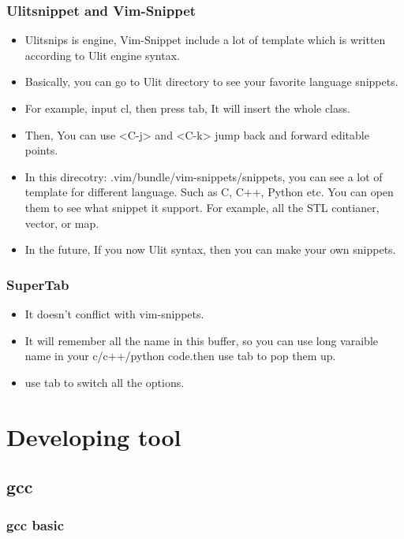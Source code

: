 \documentclass[a4paper,12pt,twoside]{book}
\begin{document}
\begin{itemize}
\begin{itemize}
\subsection{Ulitsnippet and Vim-Snippet}
\begin{itemize}
\item Ulitsnips is engine, Vim-Snippet include a lot of template which is written according to Ulit engine syntax. 
\item Basically, you can go to Ulit directory to see your favorite language snippets. 
\item For example, input cl, then press tab, It will insert the whole class. 
\item Then, You can use <C-j> and <C-k> jump back and forward editable points. 
\item In this direcotry: .vim/bundle/vim-snippets/snippets, you can see a lot of template for different language. Such as C, C++, Python etc. You can open them to see what snippet it support. For example, all the STL contianer, vector, or map. 
\item In the future, If you now Ulit syntax, then you can make your own snippets. 
\end{itemize}

\subsection{SuperTab}
\begin{itemize}
		\item It doesn't conflict with vim-snippets. 
		\item It will remember all the name in this buffer, so you can use long varaible name in your c/c++/python code.then use tab to pop them up. 
		\item use tab to switch all the options. 
\end{itemize}


\chapter{Developing tool}
\section{gcc}
\subsection{gcc basic}
\begin{itemize}


\end{itemize}
\end{itemize}
\end{itemize}
\end{document}
